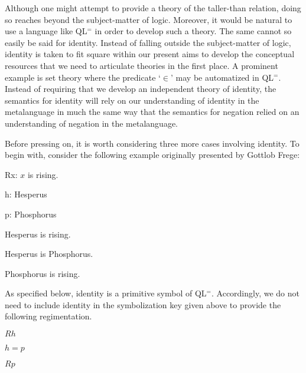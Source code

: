 Although one might attempt to provide a theory of the taller-than relation, doing so reaches beyond the subject-matter of logic.
Moreover, it would be natural to use a language like QL$^=$ in order to develop such a theory. 
The same cannot so easily be said for identity.
Instead of falling outside the subject-matter of logic, identity is taken to fit square within our present aims to develop the conceptual resources that we need to articulate theories in the first place.
A prominent example is set theory where the predicate `$\in$' may be automatized in QL$^=$.
Instead of requiring that we develop an independent theory of identity, the semantics for identity will rely on our understanding of identity in the metalanguage in much the same way that the semantics for negation relied on an understanding of negation in the metalanguage.

Before pressing on, it is worth considering three more cases involving identity.
To begin with, consider the following example originally presented by Gottlob Frege:

\begin{multicols}{2}

\begin{ekey}
    \item[Rx:] $x$ is rising.
    \item[h:] Hesperus
    \item[p:] Phosphorus
\end{ekey}

\begin{earg}
  \item[] Hesperus is rising.
  \item[] Hesperus is Phosphorus.
  \item[\therefore] Phosphorus is rising.
\end{earg}

\end{multicols}

As specified below, identity is a primitive symbol of QL$^=$.
Accordingly, we do not need to include identity in the symbolization key given above to provide the following regimentation.

\begin{earg}
  \item[] $Rh$
  \item[] $h=p$
  \item[\therefore] $Rp$
\end{earg}

